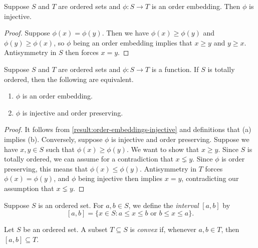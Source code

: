 \begin{lemma}
\label{result:order-embeddings-injective}
Suppose $S$ and $T$ are ordered sets and $\phi : S \to T$ is an order embedding. Then $\phi$ is injective. 
\end{lemma}

\begin{proof}
Suppose $\phi(x) = \phi(y)$. Then we have $\phi(x) \geq \phi(y)$ and $\phi(y) \geq \phi(x)$, so $\phi$ being an order embedding implies that $x \geq y$ and $y \geq x$. Antisymmetry in $S$ then forces $x = y$. 
\end{proof}

\begin{lemma} \label{result:order-embedding-total-order}
Suppose $S$ and $T$ are ordered sets and $\phi : S \to T$ is a function. If $S$ is totally ordered, then the following are equivalent. 
\begin{enumerate}[label=(\alph{*})]
\item $\phi$ is an order embedding.
\item $\phi$ is injective and order preserving. 
\end{enumerate}
\end{lemma}

\begin{proof}
It follows from \cref{result:order-embeddings-injective} and definitions that (a) implies (b). Conversely, suppose $\phi$ is injective and order preserving. Suppose we have $x, y \in S$ such that $\phi(x) \geq \phi(y)$. We want to show that $x \geq y$. Since $S$ is totally ordered, we can assume for a contradiction that $x \lneq y$. Since $\phi$ is order preserving, this means that $\phi(x) \leq \phi(y)$. Antisymmetry in $T$ forces $\phi(x) = \phi(y)$, and $\phi$ being injective then implies $x = y$, contradicting our assumption that $x \lneq y$. 
\end{proof}

\begin{definition}
\label{definition:interval}
Suppose $S$ is an ordered set. For $a, b \in S$, we define the \emph{interval} $[a, b]$ by
\[ [a, b] = \{ x \in S : a \leq x \leq b \text{ or } b \leq x \leq a \}. \]
\end{definition}

\begin{definition}
\label{definition:convex-subset}
Let $S$ be an ordered set. A subset $T \subseteq S$ is \emph{convex} if, whenever $a, b \in T$, then $[a, b] \subseteq T$. 
\end{definition}

